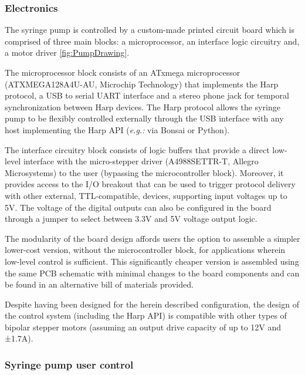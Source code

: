 \subsubsection*{Electronics}

The syringe pump is controlled by a custom-made printed circuit board which is comprised of three main blocks: a microprocessor, an interface logic circuitry and, a motor driver \ref{fig:PumpDrawing}.

The microprocessor block consists of an ATxmega microprocessor (ATXMEGA128A4U-AU, Microchip Technology) that implements the Harp  protocol, a USB to serial UART interface and a stereo phone jack for temporal synchronization between Harp devices. The Harp protocol allows the syringe pump to be flexibly controlled externally through the USB interface with any host implementing the Harp API (\textit{e.g.:} via Bonsai\citep{Lopes2015} or Python).

The interface circuitry block consists of logic buffers that provide a direct low-level interface with the micro-stepper driver (A4988SETTR-T, Allegro Microsystems) to the user (bypassing the microcontroller block). Moreover, it provides access to the I/O breakout that can be used to trigger protocol delivery with other external, TTL-compatible, devices, supporting input voltages up to 5V. The voltage of the digital outputs can also be configured in the board through a jumper to select between 3.3V and 5V voltage output logic.

The modularity of the board design affords users the option to assemble a simpler lower-cost version, without the microcontroller block, for applications wherein low-level control is sufficient. This significantly cheaper version is assembled using the same PCB schematic with minimal changes to the board components and can be found in an alternative bill of materials provided.

Despite having been designed for the herein described configuration, the design of the control system (including the Harp API) is compatible with other types of bipolar stepper motors (assuming an output drive capacity of up to 12V and ±1.7A).

\subsubsection*{Syringe pump user control}

